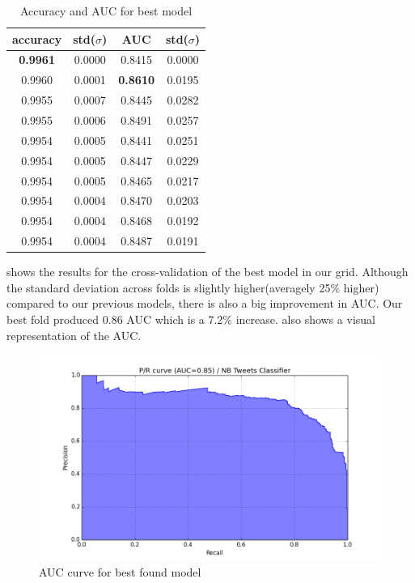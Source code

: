 \begin{table}
  \centering
  \begin{tabular}{cccc} \toprule
    accuracy        & std($\sigma$) & AUC             & std($\sigma$) \\ \midrule
    \textbf{0.9961} & 0.0000        & 0.8415          & 0.0000 \\
    0.9960          & 0.0001        & \textbf{0.8610} & 0.0195 \\
    0.9955          & 0.0007        & 0.8445          & 0.0282 \\
    0.9955          & 0.0006        & 0.8491          & 0.0257 \\
    0.9954          & 0.0005        & 0.8441          & 0.0251 \\ \midrule
    0.9954          & 0.0005        & 0.8447          & 0.0229 \\
    0.9954          & 0.0005        & 0.8465          & 0.0217 \\
    0.9954          & 0.0004        & 0.8470          & 0.0203 \\
    0.9954          & 0.0004        & 0.8468          & 0.0192 \\
    0.9954          & 0.0004        & 0.8487          & 0.0191 \\ \bottomrule
  \end{tabular}
    \caption{Accuracy and AUC for best model}
    \label{tab:best-model}
\end{table}

 shows the results for the cross-validation of the best model in our grid.
Although the standard deviation across folds is slightly higher(averagely 25\% higher) compared to
our previous models, there is also a big improvement in AUC\@. Our best fold produced 0.86 AUC which
is a 7.2\% increase.  also shows a visual representation of the AUC.


\begin{figure}[H]
  \includegraphics[scale=0.65]{Figures/pr_NB_Tweets_Classifier_04}
\caption{AUC curve for best found model}
\label{fig:auc-best-model}
\end{figure}

